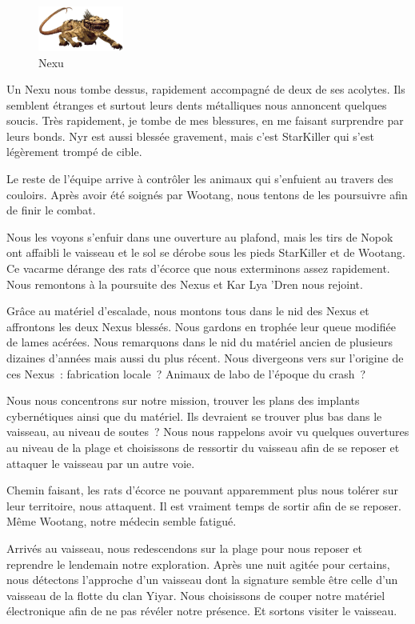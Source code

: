 \documentclass[a4paper,9pt,twoside,twocolumn,openany]{book}
\begin{document}
\begin{figure}
    \includegraphics[width=0.25\textwidth]{img/nexu.png}
    \caption{Nexu}
\end{figure}

Un Nexu nous tombe dessus, rapidement accompagné de deux de ses acolytes. Ils semblent étranges et surtout leurs dents métalliques nous annoncent quelques soucis. Très rapidement, je tombe de mes blessures, en me faisant surprendre par leurs bonds. Nyr est aussi blessée gravement, mais c’est StarKiller qui s’est légèrement trompé de cible.

Le reste de l’équipe arrive à contrôler les animaux qui s’enfuient au travers des couloirs. Après avoir été soignés par Wootang, nous tentons de les poursuivre afin de finir le combat.

Nous les voyons s’enfuir dans une ouverture au plafond, mais les tirs de Nopok ont affaibli le vaisseau et le sol se dérobe sous les pieds StarKiller et de Wootang. Ce vacarme dérange des rats d’écorce que nous exterminons assez rapidement. Nous remontons à la poursuite des Nexus et Kar Lya 'Dren nous rejoint.

Grâce au matériel d’escalade, nous montons tous dans le nid des Nexus et affrontons les deux Nexus blessés. Nous gardons en trophée leur queue modifiée de lames acérées. Nous remarquons dans le nid du matériel ancien de plusieurs dizaines d’années mais aussi du plus récent. Nous divergeons vers sur l’origine de ces Nexus\ : fabrication locale\ ? Animaux de labo de l’époque du crash\ ?

Nous nous concentrons sur notre mission, trouver les plans des implants cybernétiques ainsi que du matériel. Ils devraient se trouver plus bas dans le vaisseau, au niveau de soutes\ ? Nous nous rappelons avoir vu quelques ouvertures au niveau de la plage et choisissons de ressortir du vaisseau afin de se reposer et attaquer le vaisseau par un autre voie.

Chemin faisant, les rats d’écorce ne pouvant apparemment plus nous tolérer sur leur territoire, nous attaquent. Il est vraiment temps de sortir afin de se reposer. Même Wootang, notre médecin semble fatigué.

Arrivés au vaisseau, nous redescendons sur la plage pour nous reposer et reprendre le lendemain notre exploration. Après une nuit agitée pour certains, nous détectons l’approche d’un vaisseau dont la signature semble être celle d’un vaisseau de la flotte du clan Yiyar. Nous choisissons de couper notre matériel électronique afin de ne pas révéler notre présence. Et sortons visiter le vaisseau.
\end{document}
